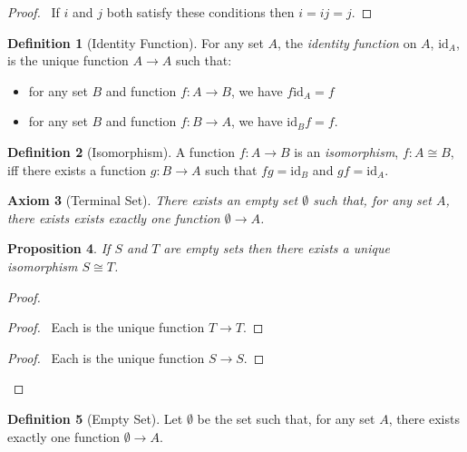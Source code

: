\documentclass{book}
\let\qed\relax
\newtheorem{ax}{Axiom}[chapter]
\newtheorem{prop}[ax]{Proposition}
\theoremstyle{definition}
\newtheorem{df}[ax]{Definition}
\begin{document}
\begin{proof}
\pf\ If $i$ and $j$ both satisfy these conditions then $i = ij = j$. \qed
\end{proof}

\begin{df}[Identity Function]
For any set $A$, the \emph{identity function} on $A$, $\mathrm{id}_A$, is the unique function $A \rightarrow A$ such that:
\begin{itemize}
\item for any set $B$ and function $f : A \rightarrow B$, we have $f \mathrm{id}_A = f$
\item for any set $B$ and function $f : B \rightarrow A$, we have $\mathrm{id}_B f = f$.
\end{itemize}
\end{df}

\begin{df}[Isomorphism]
A function $f : A \rightarrow B$ is an \emph{isomorphism}, $f : A \cong B$, iff there exists a function $g : B \rightarrow A$ such that $fg = \mathrm{id}_B$ and $gf = \mathrm{id}_A$.
\end{df}

\begin{ax}[Terminal Set]
There exists an \emph{empty} set $\emptyset$ such that, for any set $A$, there exists exists exactly one function $\emptyset \rightarrow A$.
\end{ax}

\begin{prop}
If $S$ and $T$ are empty sets then there exists a unique isomorphism $S \cong T$.
\end{prop}

\begin{proof}
\pf
{}
\begin{proof}
	\pf\ Each is the unique function $T \rightarrow T$.
\end{proof}
\begin{proof}
	\pf\ Each is the unique function $S \rightarrow S$.
\end{proof}
\qed
\end{proof}

\begin{df}[Empty Set]
Let $\emptyset$ be the set such that, for any set $A$, there exists exactly one function $\emptyset \rightarrow A$.
\end{df}
\end{document}
